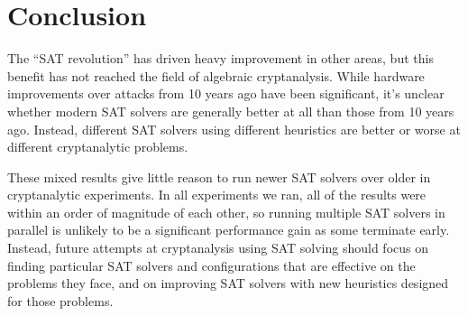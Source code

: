 \section{Conclusion}
\label{sec:conclusion}
The ``SAT revolution'' has driven heavy improvement in other areas, but this benefit has not reached the field of algebraic cryptanalysis. While hardware improvements over attacks from 10 years ago have been significant, it's unclear whether modern SAT solvers are generally better at all than those from 10 years ago. Instead, different SAT solvers using different heuristics are better or worse at different cryptanalytic problems.

These mixed results give little reason to run newer SAT solvers over older in cryptanalytic experiments. In all experiments we ran, all of the results were within an order of magnitude of each other, so running multiple SAT solvers in parallel is unlikely to be a significant performance gain as some terminate early. Instead, future attempts at cryptanalysis using SAT solving should focus on finding particular SAT solvers and configurations that are effective on the problems they face, and on improving SAT solvers with new heuristics designed for those problems.